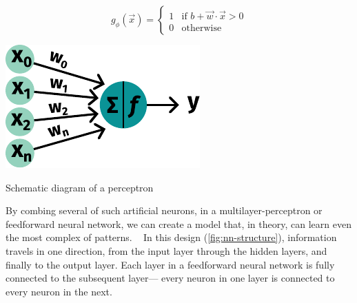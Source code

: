 \begin{equation}
    \label{eq:step-function}
    g_{\phi}(\vec{x})  = 
        \begin{cases}
            1 & \text{if } b + \vec{w} \cdot \vec{x} > 0\\
            0 & \text{otherwise}
        \end{cases}
\end{equation}

\begin{marginfigure}%
	\includegraphics[width=\linewidth]{graphics/perceptron}
	\caption{Schematic diagram of a perceptron}
    \label{fig:perceptron}
\end{marginfigure}%

By combing several of such artificial neurons,
in a multilayer-perceptron or feedforward neural network,
we can create a model that, in theory,
can learn even the most complex of patterns.
~\autocite{bishopNeural1995}
In this design (\cref{fig:nn-structure}),
information travels in one direction, from the input layer
through the hidden layers, and finally to the output layer. 
Each layer in a feedforward neural network is
fully connected to the subsequent layer---%
every neuron in one layer is connected to every neuron in the next.

